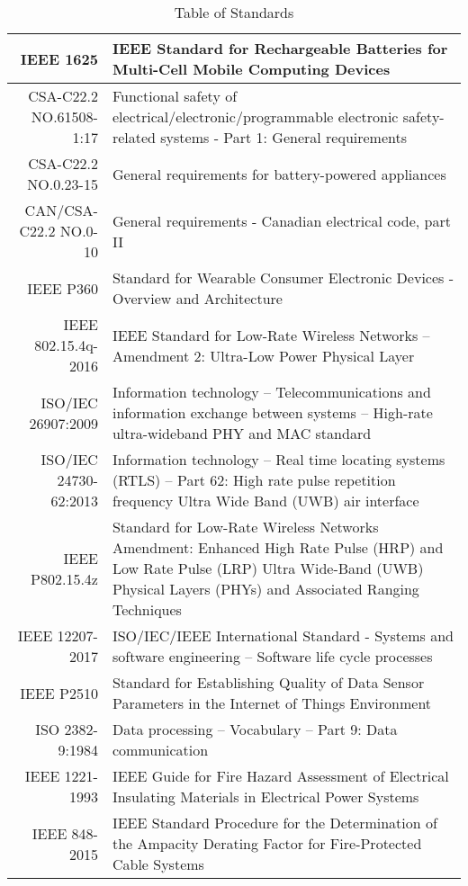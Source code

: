 \bigskip
\bgroup
\def\arraystretch{1.3}
\begin{table}[H]
\centering
\begin{tabular}{ |p{2.5cm} p{11.5cm} | }
\hline
\multicolumn{1}{|r|}{IEEE 1625} & IEEE Standard for Rechargeable Batteries for Multi-Cell Mobile Computing Devices \\ 
\hline
\multicolumn{1}{|r|}{CSA-C22.2 NO.61508-1:17} & Functional safety of electrical/electronic/programmable electronic safety-related systems - Part 1: General requirements \\ 
\hline
\multicolumn{1}{|r|}{CSA-C22.2 NO.0.23-15} & General requirements for battery-powered appliances \\  
\hline
\multicolumn{1}{|r|}{CAN/CSA-C22.2 NO.0-10} & General requirements - Canadian electrical code, part II \\ 
\hline
\multicolumn{1}{|r|}{IEEE P360} & Standard for Wearable Consumer Electronic Devices - Overview and Architecture \\  
\hline
\multicolumn{1}{|r|}{IEEE 802.15.4q-2016} & IEEE Standard for Low-Rate Wireless Networks --Amendment 2: Ultra-Low Power Physical Layer\\ 
\hline
\multicolumn{1}{|r|}{ISO/IEC 26907:2009} & Information technology -- Telecommunications and information exchange between systems -- High-rate ultra-wideband PHY and MAC standard\\  
\hline
\multicolumn{1}{|r|}{ISO/IEC 24730-62:2013} & Information technology -- Real time locating systems (RTLS) -- Part 62: High rate pulse repetition frequency Ultra Wide Band (UWB) air interface\\  
\hline
\multicolumn{1}{|r|}{IEEE P802.15.4z} & Standard for Low-Rate Wireless Networks Amendment: Enhanced High Rate Pulse (HRP) and Low Rate Pulse (LRP) Ultra Wide-Band (UWB) Physical Layers (PHYs) and Associated Ranging Techniques\\  
\hline
\multicolumn{1}{|r|}{IEEE 12207-2017} & ISO/IEC/IEEE International Standard - Systems and software engineering -- Software life cycle processes \\
\hline 
\multicolumn{1}{|r|}{IEEE P2510} & Standard for Establishing Quality of Data Sensor Parameters in the Internet of Things Environment \\ 
\hline
\multicolumn{1}{|r|}{ISO 2382-9:1984} & Data processing -- Vocabulary -- Part 9: Data communication \\
\hline 
\multicolumn{1}{|r|}{IEEE 1221-1993} & IEEE Guide for Fire Hazard Assessment of Electrical Insulating Materials in Electrical Power Systems \\ 
\hline
\multicolumn{1}{|r|}{IEEE 848-2015} & IEEE Standard Procedure for the Determination of the Ampacity Derating Factor for Fire-Protected Cable Systems\\ 
\hline
\end{tabular}
\caption{Table of Standards}
\end{table}	
